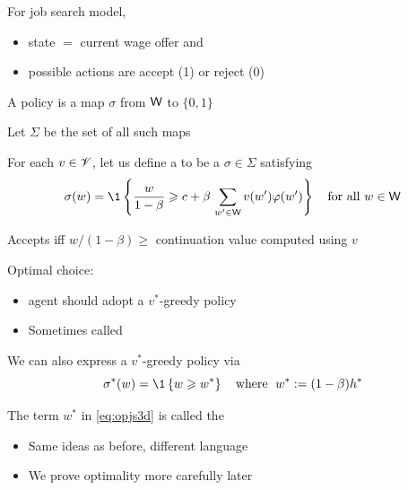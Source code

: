 \begin{frame}
    
    For job search model, 
    \begin{itemize}
        \item state $=$ current wage offer and 
        \item possible actions are accept (1) or reject (0)
    \end{itemize}

    A policy is a map $\sigma$ from $\mathsf W$ to $\{0,1\}$

    Let $\Sigma$ be the set of all such maps

    For each $v \in \mathscr V$, let us define a  to be a $\sigma \in \Sigma$ satisfying
    \begin{equation*}
        \sigma(w) 
        = \1
        \left\{
            \frac{w}{1-\beta}
            \geq
            c + \beta \, \sum_{w' \in \Wsf} v(w') \phi(w')
        \right\}
        \quad \text{for all } w \in \Wsf
    \end{equation*}

    Accepts iff $w/(1-\beta) \geq$ continuation value computed
    using $v$ 

\end{frame}


\begin{frame}
    
    Optimal choice:
    \begin{itemize}
        \item agent should adopt a $v^*$-greedy policy
            \vspace{0.5em}
        \item Sometimes called 
    \end{itemize}


    We can also express a $v^*$-greedy policy via
    \begin{equation}
        \label{eq:opjs3d}
        \sigma^*(w) 
        = \1
        \left\{
            w \geq w^*
        \right\}
        \quad \text{where } \;
        w^* := (1 - \beta) h^* 
    \end{equation}

    The term $w^*$ in \eqref{eq:opjs3d} is called the 

    \begin{itemize}
        \item Same ideas as before, different language
            \vspace{0.5em}
        \item We prove optimality more carefully later
    \end{itemize}

\end{frame}


